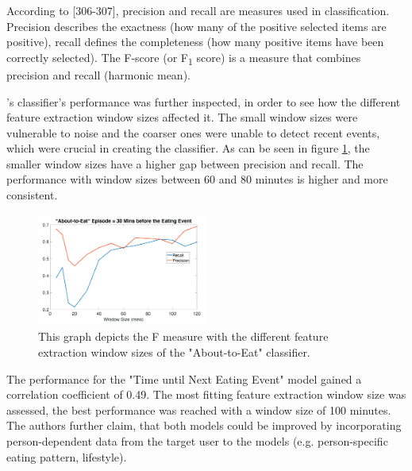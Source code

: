 According to \textcite{han2011data}[306-307], precision and recall are measures used in classification. Precision describes the exactness (how many of the positive selected items are positive), recall defines the completeness (how many positive items have been correctly selected). The F-score (or F\textsubscript{1} score) is a measure that combines precision and recall (harmonic mean).


\textcite{AboutToEat2016Rahman}'s classifier's performance was further inspected, in order to see how the different feature extraction window sizes affected it. The small window sizes were vulnerable to noise and the coarser ones were unable to detect recent events, which were crucial in creating the classifier. As can be seen in figure \ref{figure:windowSize}, the smaller window sizes have a higher gap between precision and recall. The performance with window sizes between 60 and 80 minutes is higher and more consistent.

\begin{figure}[h]
  \centering
  \includegraphics[width=0.5\textwidth]{./images/windowSizePerformance.png}
  \caption{This graph depicts the F measure with the different feature extraction window sizes of the "About-to-Eat" classifier.}
  \label{figure:windowSize}
\end{figure}

The performance for the "Time until Next Eating Event" model gained a correlation coefficient of 0.49. The most fitting feature extraction window size was assessed, the best performance was reached with a window size of 100 minutes.
The authors further claim, that both models could be improved by incorporating person-dependent data from the target user to the models (e.g. person-specific eating pattern, lifestyle).



